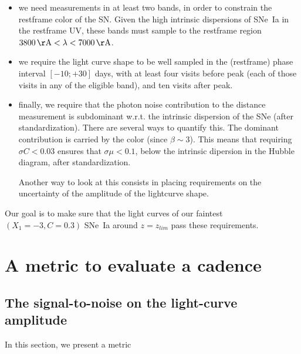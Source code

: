 \documentclass[\docopts]{\docclass}
\begin{document}
\begin{itemize}
\item we need measurements in at least two bands, in order to
  constrain the restframe color of the SN. Given the high intrinsic
  dispersions of SNe~Ia in the restframe UV, these bands must sample
  to the restframe region $3800 \angstrom < \lambda < 7000 \angstrom$.

\item we require the light curve shape to be well sampled in the
  (restframe) phase interval $[-10;+30]$ days, with at least four
  visits before peak (each of those visits in any of the eligible
  band), and ten visits after peak.
  
\item finally, we require that the photon noise contribution to the
  distance measurement is subdominant w.r.t. the intrinsic dispersion
  of the SNe (after standardization).  There are several ways to
  quantify this.  The dominant contribution is carried by the color
  (since $\beta \sim 3$). This means that requiring $\sigma C < 0.03$
  ensures that $\sigma \mu < 0.1$, below the intrinsic dipersion in
  the Hubble diagram, after standardization.

  Another way to look at this consists in placing requirements on the
  uncertainty of the amplitude of the lightcurve shape. 
\end{itemize}

Our goal is to make sure that the light curves of our faintest
$(X_1=-3, C=0.3)$ SNe~Ia around $z = z_{lim}$ pass these requirements.



\section{A metric to evaluate a cadence}
\label{sec:methods}

\subsection{The signal-to-noise on the light-curve amplitude}

In this section, we present a metric 
\end{document}

